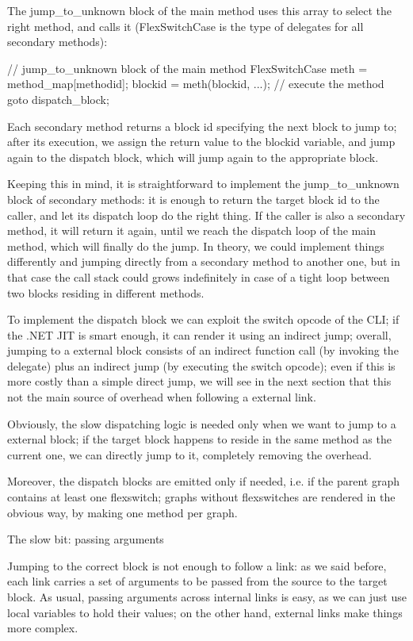 {The jump_to_unknown block of the main method uses this array to select the right method, and calls it (FlexSwitchCase is the type of delegates for all secondary methods):

// jump_to_unknown block of the main method
FlexSwitchCase meth = method_map[methodid];
blockid = meth(blockid, ...); // execute the method
goto dispatch_block;

Each secondary method returns a block id specifying the next block to jump to; after its execution, we assign the return value to the blockid variable, and jump again to the dispatch block, which will jump again to the appropriate block.

Keeping this in mind, it is straightforward to implement the jump_to_unknown block of secondary methods: it is enough to return the target block id to the caller, and let its dispatch loop do the right thing. If the caller is also a secondary method, it will return it again, until we reach the dispatch loop of the main method, which will finally do the jump. In theory, we could implement things differently and jumping directly from a secondary method to another one, but in that case the call stack could grows indefinitely in case of a tight loop between two blocks residing in different methods.

To implement the dispatch block we can exploit the switch opcode of the CLI; if the .NET JIT is smart enough, it can render it using an indirect jump; overall, jumping to a external block consists of an indirect function call (by invoking the delegate) plus an indirect jump (by executing the switch opcode); even if this is more costly than a simple direct jump, we will see in the next section that this not the main source of overhead when following a external link.

Obviously, the slow dispatching logic is needed only when we want to jump to a external block; if the target block happens to reside in the same method as the current one, we can directly jump to it, completely removing the overhead.

Moreover, the dispatch blocks are emitted only if needed, i.e. if the parent graph contains at least one flexswitch; graphs without flexswitches are rendered in the obvious way, by making one method per graph.

The slow bit: passing arguments

Jumping to the correct block is not enough to follow a link: as we said before, each link carries a set of arguments to be passed from the source to the target block. As usual, passing arguments across internal links is easy, as we can just use local variables to hold their values; on the other hand, external links make things more complex.

}
